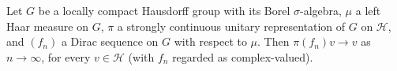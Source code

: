 Let $G$ be a locally compact Hausdorff group with its Borel $\sigma$-algebra, $\mu$ a left Haar measure on $G$, $\pi$ a
strongly continuous unitary representation of $G$ on $\mathcal H$, and $(f_n)$ a Dirac sequence on $G$ with respect to
$\mu$. Then $\pi(f_n)v\to v$ as $n\to\infty$, for every $v\in\mathcal H$ (with $f_n$ regarded as complex-valued).
